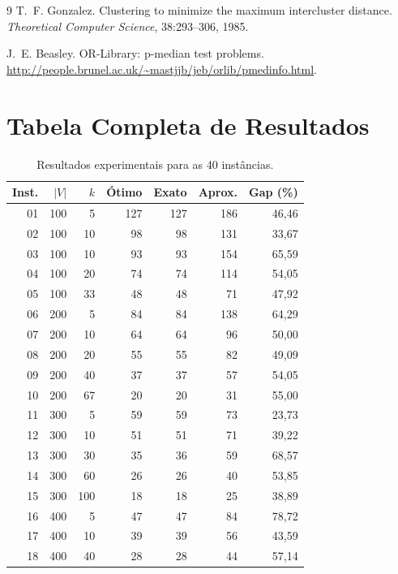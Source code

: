 \documentclass[12pt,a4paper]{article}
\begin{document}
\begin{thebibliography}{9}
T.~F. Gonzalez.
Clustering to minimize the maximum intercluster distance.
\textit{Theoretical Computer Science}, 38:293--306, 1985.

J.~E. Beasley.
OR-Library: p-median test problems.
\url{http://people.brunel.ac.uk/~mastjjb/jeb/orlib/pmedinfo.html}.
\end{thebibliography}

\newpage
\appendix
\section{Tabela Completa de Resultados}
\label{sec:apendice}

\begin{table}[H]
\centering
\caption{Resultados experimentais para as 40 instâncias.}
\label{tab:resultados}
\small
\begin{tabular}{rrrrrrr}
\toprule
Inst. & $|V|$ & $k$ & Ótimo & Exato & Aprox. & Gap (\%) \\
\midrule
01 & 100 & 5   & 127 & 127 & 186 & 46,46 \\
02 & 100 & 10  & 98  & 98  & 131 & 33,67 \\
03 & 100 & 10  & 93  & 93  & 154 & 65,59 \\
04 & 100 & 20  & 74  & 74  & 114 & 54,05 \\
05 & 100 & 33  & 48  & 48  & 71  & 47,92 \\
06 & 200 & 5   & 84  & 84  & 138 & 64,29 \\
07 & 200 & 10  & 64  & 64  & 96  & 50,00 \\
08 & 200 & 20  & 55  & 55  & 82  & 49,09 \\
09 & 200 & 40  & 37  & 37  & 57  & 54,05 \\
10 & 200 & 67  & 20  & 20  & 31  & 55,00 \\
11 & 300 & 5   & 59  & 59  & 73  & 23,73 \\
12 & 300 & 10  & 51  & 51  & 71  & 39,22 \\
13 & 300 & 30  & 35  & 36  & 59  & 68,57 \\
14 & 300 & 60  & 26  & 26  & 40  & 53,85 \\
15 & 300 & 100 & 18  & 18  & 25  & 38,89 \\
16 & 400 & 5   & 47  & 47  & 84  & 78,72 \\
17 & 400 & 10  & 39  & 39  & 56  & 43,59 \\
18 & 400 & 40  & 28  & 28  & 44  & 57,14 \\

\end{tabular}
\end{table}
\end{document}
